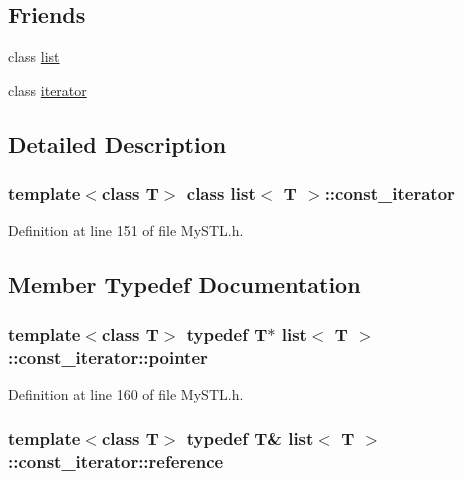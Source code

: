 \subsection*{Friends}
\begin{DoxyCompactItemize}
\item 
class \hyperlink{classlist_1_1const__iterator_a39e8296e3b93358d0af90000b5d9113c}{list}
\item 
class \hyperlink{classlist_1_1const__iterator_a67171474c4da6cc8efe0c7fafefd2b2d}{iterator}
\end{DoxyCompactItemize}


\subsection{Detailed Description}
\subsubsection*{template$<$class T$>$ class list$<$ T $>$::const\_\-iterator}



Definition at line 151 of file MySTL.h.



\subsection{Member Typedef Documentation}
\subsubsection[{pointer}]{\setlength{\rightskip}{0pt plus 5cm}template$<$class T$>$ typedef T$\ast$ {\bf list}$<$ T $>$::{\bf const\_\-iterator::pointer}}\label{classlist_1_1const__iterator_a25945664ce22d7fb6211f0f8b84ed23f}


Definition at line 160 of file MySTL.h.

\subsubsection[{reference}]{\setlength{\rightskip}{0pt plus 5cm}template$<$class T$>$ typedef T\& {\bf list}$<$ T $>$::{\bf const\_\-iterator::reference}}\label{classlist_1_1const__iterator_ad4af4d92e40fe0a31c4a8911199aee89}


